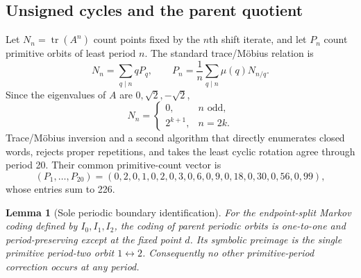 \documentclass[11pt]{article}
\newtheorem{lemma}[theorem]{Lemma}
\theoremstyle{definition}
\theoremstyle{remark}
\begin{document}
\subsection{Unsigned cycles and the parent quotient}

Let \(N_n=\operatorname{tr}(A^n)\) count points fixed by the \(n\)th
shift iterate, and let \(P_n\) count primitive orbits of least period \(n\).
The standard trace/M\"obius relation \citep{lind2021symbolic,bowen1970zeta}
is
\begin{equation}
 N_n=\sum_{q\mid n}qP_q,
 \qquad
 P_n=\frac1n\sum_{q\mid n}\mu(q)N_{n/q}.
 \label{eq:mobius}
\end{equation}
Since the eigenvalues of \(A\) are \(0,\sqrt2,-\sqrt2\),
\begin{equation}
 N_n=\begin{cases}0,&n\text{ odd},\\2^{k+1},&n=2k.\end{cases}
 \label{eq:fixed-counts}
\end{equation}
Trace/M\"obius inversion and a second algorithm that directly enumerates
closed words, rejects proper repetitions, and takes the least cyclic rotation
agree through period 20.  Their common primitive-count vector is
\begin{equation}
 (P_1,\ldots,P_{20})=
 (0,2,0,1,0,2,0,3,0,6,0,9,0,18,0,30,0,56,0,99),
 \label{eq:primitive-vector}
\end{equation}
whose entries sum to 226.

\begin{lemma}[Sole periodic boundary identification]
\label{lem:sole-boundary}
For the endpoint-split Markov coding defined by
\(I_0,I_1,I_2\), the coding of parent periodic orbits is one-to-one and
period-preserving except at the fixed point \(d\).  Its symbolic preimage is
the single primitive period-two orbit \(1\leftrightarrow2\).  Consequently no
other primitive-period correction occurs at any period.
\end{lemma}
\end{document}
